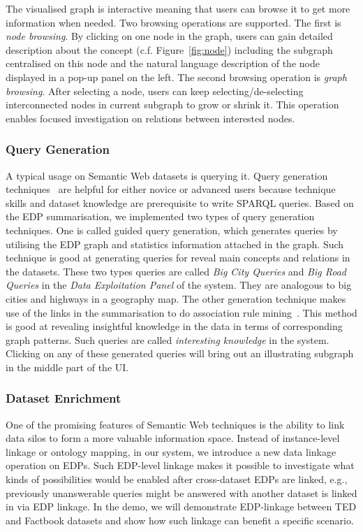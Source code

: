The visualised graph is interactive meaning that users can browse it to get more information when needed. Two browsing operations are supported. The first is \emph{node browsing}. By clicking on one node in the graph, users can gain detailed description about the concept (c.f. Figure~\ref{fig:node}) including the subgraph centralised on this node and the natural language description of the node displayed in a pop-up panel on the left. The second browsing operation is \emph{graph browsing}. After selecting a node, users can keep selecting/de-selecting interconnected nodes in current subgraph to grow or shrink it. This operation enables focused investigation on relations between interested nodes.

\subsubsection{Query Generation}
A typical usage on Semantic Web datasets is querying it. Query generation techniques~\cite{pan2013query} are helpful for either novice or advanced users because technique skills and dataset knowledge are prerequisite to write SPARQL queries. Based on the EDP summarisation, we implemented two types of query generation techniques. One is called guided query generation, which generates queries by utilising the EDP graph and statistics information attached in the graph. Such technique is good at generating queries for reveal main concepts and relations in the datasets. These two types queries are called \emph{Big City Queries} and \emph{Big Road Queries} in the \emph{Data Exploitation Panel} of the system. They are analogous to big cities and highways in a geography map. The other generation technique makes use of the links in the summarisation to do association rule mining~\cite{pan2013query}. This method is good at revealing insightful knowledge in the data in terms of corresponding graph patterns. Such queries are called \emph{interesting knowledge} in the system. Clicking on any of these generated queries will bring out an illustrating subgraph in the middle part of the UI.  

\subsubsection{Dataset Enrichment}
One of the promising features of Semantic Web techniques is the ability to link data silos to form a more valuable information space. Instead of instance-level linkage or ontology mapping, in our system, we introduce a new data linkage operation on EDPs. Such EDP-level linkage makes it possible to investigate what kinds of possibilities would be enabled after cross-dataset EDPs are linked, e.g., previously unanswerable queries might be answered with another dataset is linked in via EDP linkage. In the demo, we will demonstrate EDP-linkage between TED and Factbook datasets and show how such linkage can benefit a specific scenario.
